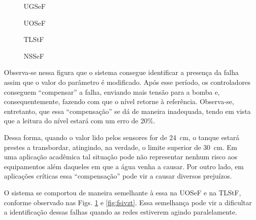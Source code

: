 \documentclass[10pt,fleqn,a4paper]{article}
\begin{document}
\begin{figure}[htb]
    \begin{minipage}[b]{0.48\linewidth}
        \scalebox{0.65}{}
        \vspace{0.5cm}
        \caption{UGSeF}
        \label{fig:fsedg}
    \end{minipage}
    \hfill
    \begin{minipage}[b]{0.48\linewidth}
        \scalebox{0.65}{}
        \vspace{0.5cm}
        \caption{UOSeF}
        \label{fig:fsedo}
    \end{minipage}
\end{figure}

\begin{figure}[htb]
    \begin{minipage}[b]{0.48\linewidth}
        \scalebox{0.65}{}
        \vspace{0.5cm}
        \caption{TLStF}
        \label{fig:fsivzt}
    \end{minipage}
    \hfill
    \begin{minipage}[b]{0.48\linewidth}
        \scalebox{0.65}{}
        \vspace{0.5cm}
        \caption{NSSeF}
        \label{fig:fsesr}
    \end{minipage}
\end{figure}

Observa-se nessa figura que o sistema consegue identificar a presença da falha
assim que o valor do parâmetro é modificado. Após esse período, os controladores
conseguem ``compensar'' a falha, enviando mais tensão para a bomba e,
consequentemente, fazendo com que o nível retorne à referência. Observa-se,
entretanto, que essa ``compensação'' se dá de maneira inadequada, tendo em vista
que a leitura do nível estará com um erro de 20\%. 

Dessa forma, quando o valor lido pelos sensores for de 24\ cm, o tanque estará
prestes a transbordar, atingindo, na verdade, o limite superior de 30\ cm. Em
uma aplicação acadêmica tal situação pode não representar nenhum risco aos
equipamentos além daqueles em que a água venha a causar. Por outro lado, em
aplicações críticas essa ``compensação'' pode vir a causar diversos prejuízos.

O sistema se comportou de maneira semelhante à essa na UOSeF e na TLStF,
conforme observado nas Figs. \ref{fig:fsedo} e \ref{fig:fsivzt}. Essa semelhança
pode vir a dificultar a identificação dessas falhas quando as redes estiverem
agindo paralelamente.
\end{document}
